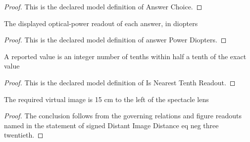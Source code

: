 \begin{proof}
  This is the declared model definition of Answer Choice.
\end{proof}
\begin{definition}
  \label{def:physics:phyx-mini-0130:phyxminiproblems-problemphyxmini0130-answerpowerdiopters}
  The displayed optical-power readout of each answer, in diopters
\end{definition}
\begin{proof}
  This is the declared model definition of answer Power Diopters.
\end{proof}
\begin{definition}
  \label{def:physics:phyx-mini-0130:phyxminiproblems-problemphyxmini0130-isnearesttenthreadout}
  A reported value is an integer number of tenths within half a tenth of the exact value
\end{definition}
\begin{proof}
  This is the declared model definition of Is Nearest Tenth Readout.
\end{proof}
\begin{lemma}
  \label{lem:physics:phyx-mini-0130:phyxminiproblems-problemphyxmini0130-signeddistantimagedistance-eq-neg-three-twentieth}
  The required virtual image is 15 cm to the left of the spectacle lens
\end{lemma}
\begin{proof}
  The conclusion follows from the governing relations and figure readouts named in the statement of signed Distant Image Distance eq neg three twentieth.
\end{proof}
